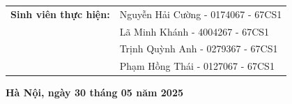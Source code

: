 \documentclass[main.tex]{subfiles}
\begin{document}
\begin{titlepage}
\begin{center}
\begin{table}[H]
\begin{tabular}{l l}
{\textbf{\fontsize{16pt}{0pt}\selectfont Sinh viên thực hiện:}} & {\fontsize{16pt}{0pt}\selectfont Nguyễn Hải Cường - 0174067 - 67CS1}\vspace{6pt}\\
& {\fontsize{16pt}{0pt}\selectfont Lã Minh Khánh - 4004267 - 67CS1}\vspace{6pt}\\
& {\fontsize{16pt}{0pt}\selectfont Trịnh Quỳnh Anh - 0279367 - 67CS1}\vspace{6pt}\\
& {\fontsize{16pt}{0pt}\selectfont Phạm Hồng Thái - 0127067 - 67CS1}\vspace{6pt}\\

\end{tabular}
\end{table}

\vspace{2cm}
\textbf{\fontsize{14pt}{0pt}\selectfont Hà Nội, ngày 30 tháng 05 năm 2025}\\

\end{center}
\end{titlepage}
\end{document}
